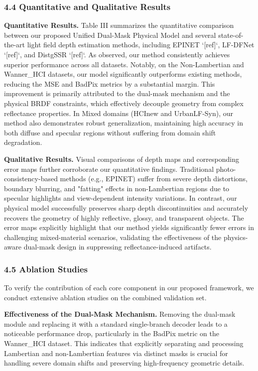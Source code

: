 \subsubsection{4.4 Quantitative and Qualitative Results}

\textbf{Quantitative Results.} 
Table III summarizes the quantitative comparison between our proposed Unified Dual-Mask Physical Model and several state-of-the-art light field depth estimation methods, including EPINET `[ref]`, LF-DFNet `[ref]`, and DistgSSR `[ref]`. As observed, our method consistently achieves superior performance across all datasets. Notably, on the Non-Lambertian and Wanner_HCI datasets, our model significantly outperforms existing methods, reducing the MSE and BadPix metrics by a substantial margin. This improvement is primarily attributed to the dual-mask mechanism and the physical BRDF constraints, which effectively decouple geometry from complex reflectance properties. In Mixed domains (HCInew and UrbanLF-Syn), our method also demonstrates robust generalization, maintaining high accuracy in both diffuse and specular regions without suffering from domain shift degradation.

\textbf{Qualitative Results.} 
Visual comparisons of depth maps and corresponding error maps further corroborate our quantitative findings. Traditional photo-consistency-based methods (e.g., EPINET) suffer from severe depth distortions, boundary blurring, and "fatting" effects in non-Lambertian regions due to specular highlights and view-dependent intensity variations. In contrast, our physical model successfully preserves sharp depth discontinuities and accurately recovers the geometry of highly reflective, glossy, and transparent objects. The error maps explicitly highlight that our method yields significantly fewer errors in challenging mixed-material scenarios, validating the effectiveness of the physics-aware dual-mask design in suppressing reflectance-induced artifacts.

\subsubsection{4.5 Ablation Studies}

To verify the contribution of each core component in our proposed framework, we conduct extensive ablation studies on the combined validation set. 

\textbf{Effectiveness of the Dual-Mask Mechanism.} 
Removing the dual-mask module and replacing it with a standard single-branch decoder leads to a noticeable performance drop, particularly in the BadPix metric on the Wanner_HCI dataset. This indicates that explicitly separating and processing Lambertian and non-Lambertian features via distinct masks is crucial for handling severe domain shifts and preserving high-frequency geometric details.

